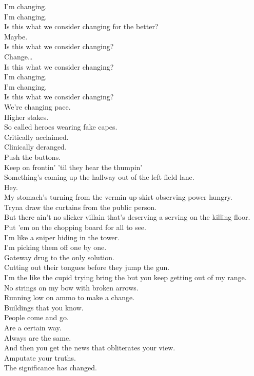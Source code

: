 I'm changing. \\
I'm changing. \\
Is this what we consider changing for the better? \\
Maybe. \\
Is this what we consider changing? \\
Change… \\

Is this what we consider changing? \\
I'm changing. \\
I'm changing. \\
Is this what we consider changing? \\

We're changing pace. \\
Higher stakes. \\
So called heroes wearing fake capes. \\
Critically acclaimed. \\
Clinically deranged. \\
Push the buttons. \\
Keep on frontin' 'til they hear the thumpin' \\
Something's coming up the hallway out of the left field lane. \\
Hey. \\
My stomach's turning from the vermin up-skirt observing power hungry. \\
Tryna draw the curtains from the public person. \\
But there ain't no slicker villain that's deserving a serving on the killing floor. \\
Put 'em on the chopping board for all to see. \\

I'm like a sniper hiding in the tower. \\
I'm picking them off one by one. \\
Gateway drug to the only solution. \\
Cutting out their tongues before they jump the gun. \\
I'm the like the cupid trying bring the  but you keep getting out of my range. \\
No strings on my bow with broken arrows. \\
Running low on ammo to make a change. \\

Buildings that you know. \\
People come and go. \\
Are a certain way. \\
Always are the same. \\
And then you get the news that obliterates your view. \\
Amputate your truths. \\
The significance has changed. \\

